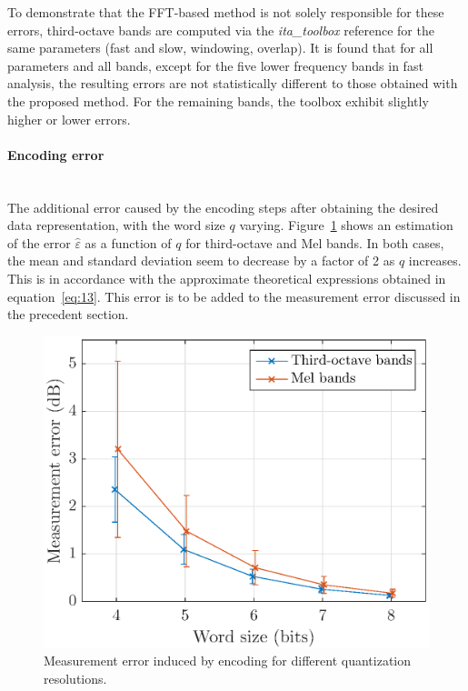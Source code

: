 \documentclass[12pt,times,onecolumn]{article}
\begin{document}
To demonstrate that the FFT-based method is not solely responsible for these errors, third-octave bands are computed via the \textit{ita\_toolbox} reference for the same parameters (fast and slow, windowing, overlap). It is found that for all parameters and all bands, except for the five lower frequency bands in fast analysis, the resulting errors are not statistically different to those obtained with the proposed method. For the remaining bands, the toolbox exhibit slightly higher or lower errors.

\paragraph{Encoding error\\\\}
The additional error caused by the encoding steps after obtaining the desired data representation, with the word size $q$ varying. Figure~\ref{fig:error_q} shows an estimation of the error $\hat{\varepsilon}$ as a function of $q$ for third-octave and Mel bands. In both cases, the mean and standard deviation seem to decrease by a factor of 2 as $q$ increases. This is in accordance with the approximate theoretical expressions obtained in equation~\ref{eq:13}. This error is to be added to the measurement error discussed in the precedent section.

\begin{figure}[htbp]
	\centering
		\includegraphics[width=0.7\columnwidth]{figures/error_qall.eps}
	\caption{Measurement error induced by encoding for different quantization resolutions.}
	\label{fig:error_q}
\end{figure}
\end{document}

